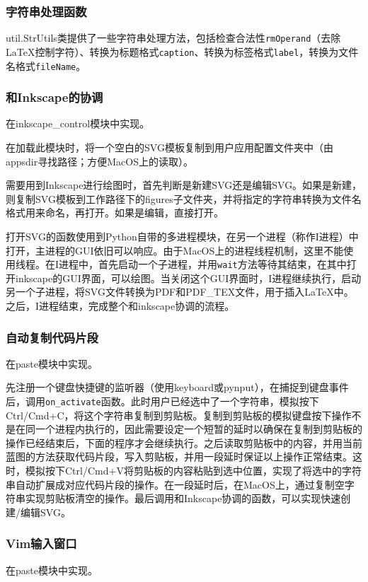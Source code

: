 \documentclass[AutoFakeBold,letterpaper,12pt,hidelinks]{article}
\begin{document}
\subsubsection{字符串处理函数}

util.StrUtils类提供了一些字符串处理方法，包括检查合法性\texttt{rmOperand}（去除LaTeX控制字符）、转换为标题格式\texttt{caption}、转换为标签格式\texttt{label}，转换为文件名格式\texttt{fileName}。

\subsubsection{和Inkscape的协调}

在inkscape\_control模块中实现。

在加载此模块时，将一个空白的SVG模板复制到用户应用配置文件夹中（由appsdir寻找路径；方便MacOS上的读取）。

需要用到Inkscape进行绘图时，首先判断是新建SVG还是编辑SVG。如果是新建，则复制SVG模板到工作路径下的figures子文件夹，并将指定的字符串转换为文件名格式用来命名，再打开。如果是编辑，直接打开。

打开SVG的函数使用到Python自带的多进程模块，在另一个进程（称作I进程）中打开，主进程的GUI依旧可以响应。由于MacOS上的进程线程机制，这里不能使用线程。在I进程中，首先启动一个子进程，并用\texttt{wait}方法等待其结束，在其中打开inkscape的GUI界面，可以绘图。当关闭这个GUI界面时，I进程继续执行，启动另一个子进程，将SVG文件转换为PDF和PDF\_TEX文件，用于插入LaTeX中。之后，I进程结束，完成整个和inkscape协调的流程。

\subsubsection{自动复制代码片段}

在paste模块中实现。

先注册一个键盘快捷键的监听器（使用keyboard或pynput），在捕捉到键盘事件后，调用\texttt{on\_activate}函数。此时用户已经选中了一个字符串，模拟按下Ctrl/Cmd+C，将这个字符串复制到剪贴板。复制到剪贴板的模拟键盘按下操作不是在同一个进程内执行的，因此需要设定一个短暂的延时以确保在复制到剪贴板的操作已经结束后，下面的程序才会继续执行。之后读取剪贴板中的内容，并用当前蓝图的方法获取代码片段，写入剪贴板，并用一段延时保证以上操作正常结束。这时，模拟按下Ctrl/Cmd+V将剪贴板的内容粘贴到选中位置，实现了将选中的字符串自动扩展成对应代码片段的操作。在一段延时后，在MacOS上，通过复制空字符串实现剪贴板清空的操作。最后调用和Inkscape协调的函数，可以实现快速创建/编辑SVG。

\subsubsection{Vim输入窗口}
在paste模块中实现。
\end{document}
